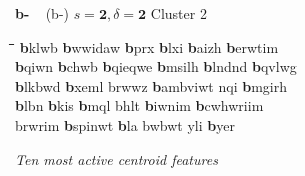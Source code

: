 \begin{figure}[t]
\begin{mdframed}
{\LARGE \textbf{b-}}  {\large\,\,\, (b-)} \hfill {\large$s=\textbf{2}, \delta=\textbf{2}$} \hfill Cluster 2\\
\vspace{-10pt}
\begin{normalsize}
\begin{tabbing}
\hspace*{16ex}\= \hspace*{16ex}\=\hspace*{16ex}\=\hspace*{16ex}\=\hspace*{16ex}\=\hspace*{13ex} \kill
\textbf{b}klwb \> \textbf{b}wwidaw \> \textbf{b}prx \> \textbf{b}lxi \> \textbf{b}aizh \> \textbf{b}erwtim \\
\textbf{b}qiwn \> \textbf{b}chwb \> \textbf{b}qieqwe \> \textbf{b}msilh \> \textbf{b}lndnd \> \textbf{b}qvlwg \\
\textbf{b}lkbwd \> \textbf{b}xeml \> brwwz \> \textbf{b}ambviwt \> nqi \> \textbf{b}mgirh \\
\textbf{b}lbn \> \textbf{b}kis \>\textbf{b}mql \> bhlt \> \textbf{b}iwnim \>\textbf{b}cwhwriim \\
brwrim \> \textbf{b}spinwt \> \textbf{b}la \> bwbwt \> yli \> \textbf{b}yer
\end{tabbing}
\end{normalsize}
\vspace{-3pt}
\begin{mdframed}
\begin{small}
\textit{Ten most active centroid features}
\begin{tabbing}

\end{tabbing}
\end{small}
\end{mdframed}
\end{mdframed}
\end{figure}
